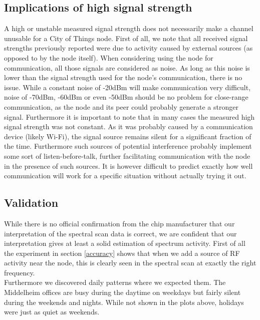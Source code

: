 \documentclass[a4paper, 11pt]{article}
\begin{document}
\subsection{Implications of high signal strength}
A high or unstable measured signal strength does not necessarily make a channel unusable for a City of Things node. First of all, we note that all received signal strengths previously reported were due to activity caused by external sources (as opposed to by the node itself). When considering using the node for communication, all those signals are considered as noise. As long as this noise is lower than the signal strength used for the node's communication, there is no issue. While a constant noise of -20dBm will make communication very difficult, noise of -70dBm, -60dBm or even -50dBm should be no problem for close-range communication, as the node and its peer could probably generate a stronger signal. Furthermore it is important to note that in many cases the measured high signal strength was not constant. As it was probably caused by a communication device (likely Wi-Fi), the signal source remains silent for a significant fraction of the time. Furthermore such sources of potential interference probably implement some sort of listen-before-talk, further facilitating communication with the node in the presence of such sources. It is however difficult to predict exactly how well communication will work for a specific situation without actually trying it out.
\subsection{Validation}
While there is no official confirmation from the chip manufacturer that our interpretation of the spectral scan data is correct, we are confident that our interpretation gives at least a solid estimation of spectrum activity. First of all the experiment in section \ref{accuracy} shows that when we add a source of RF activity near the node, this is clearly seen in the spectral scan at exactly the right frequency. \\
Furthermore we discovered daily patterns where we expected them. The Middelheim offices are busy during the daytime on weekdays but fairly silent during the weekends and nights. While not shown in the plots above, holidays were just as quiet as weekends.
\end{document}
